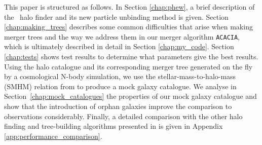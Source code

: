This paper is structured as follows.  In Section \ref{chap:phew}, a
brief description of the \phew\ halo finder and its new particle
unbinding method is given. Section \ref{chap:making_trees} describes
some common difficulties that arise when making merger trees and the
way we address them in our merger algorithm \texttt{ACACIA}, which is
ultimately described in detail in Section \ref{chap:my_code}.
Section \ref{chap:tests} shows test results to
determine what parameters give the best results.  Using the halo
catalogue and its corresponding merger tree generated on the fly by a
cosmological N-body simulation, we use the stellar-mass-to-halo-mass
(SMHM) relation from \cite{Behroozi} to produce a mock galaxy
catalogue. We analyse in Section~\ref{chap:mock_catalogues} the
properties of our mock galaxy catalogue and show that the introduction
of orphan galaxies improve the comparison to observations considerably.
Finally, a detailed comparison with the other halo finding and
tree-building algorithms presented in \citet{SUSSING_HALOFINDER} is
given in Appendix \ref{app:performance_comparison}.
